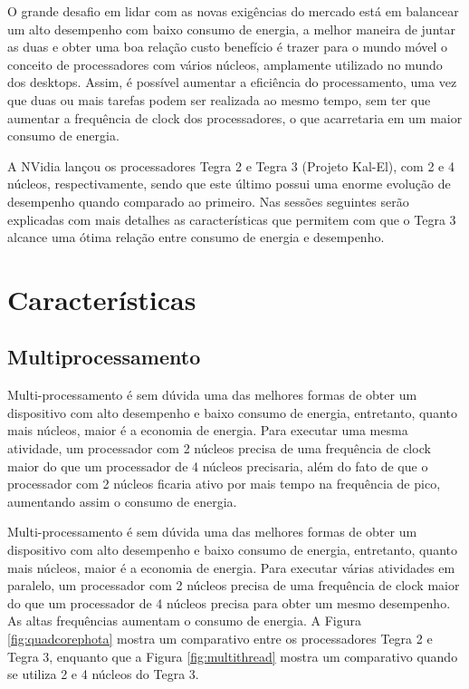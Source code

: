 \documentclass[article]{IEEEtran}
\begin{document}
O grande desafio em lidar com as novas exig\^encias do mercado est\'a em balancear um alto desempenho com baixo consumo de energia, a melhor maneira de juntar as duas e obter uma boa rela\c{c}\~ao custo benef\'icio \'e trazer para o mundo m\'ovel o conceito de processadores com v\'arios n\'ucleos, amplamente utilizado no mundo dos desktops. Assim, \'e poss\'ivel aumentar a efici\^encia do processamento, uma vez que duas ou mais tarefas podem ser realizada ao mesmo tempo, sem ter que aumentar a frequ\^encia de clock dos processadores, o que acarretaria em um maior consumo de energia.

A NVidia lan\c{c}ou os processadores Tegra 2 e Tegra 3 (Projeto Kal-El), com 2 e 4 n\'ucleos, respectivamente, sendo que este \'ultimo possui uma enorme evolu\c{c}\~ao de desempenho quando comparado ao primeiro. Nas sess\~oes seguintes ser\~ao explicadas com mais detalhes as caracter\'isticas que permitem com que o Tegra 3 alcance uma \'otima rela\c{c}\~ao entre consumo de energia e desempenho.

\section{Caracter\'isticas}

\subsection{Multiprocessamento}

Multi-processamento \'e sem d\'uvida uma das melhores formas de obter um dispositivo com alto desempenho e baixo consumo de energia, entretanto, quanto mais n\'ucleos, maior \'e a economia de energia. Para executar uma mesma atividade, um processador com 2 n\'ucleos precisa de uma frequ\^encia de clock maior do que um processador de 4 n\'ucleos precisaria, al\'em do fato de que o processador com 2 n\'ucleos ficaria ativo por mais tempo na frequ\^encia de pico, aumentando assim o consumo de energia. 

Multi-processamento \'e sem d\'uvida uma das melhores formas de obter um dispositivo com alto desempenho e baixo consumo de energia, entretanto, quanto mais n\'ucleos, maior \'e a economia de energia. Para executar várias atividades em paralelo, um processador com 2 n\'ucleos precisa de uma frequ\^encia de clock maior do que um processador de 4 n\'ucleos precisa para obter um mesmo desempenho. As altas frequ\^encias aumentam o consumo de energia. A Figura \ref{fig:quadcorephota} mostra um comparativo entre os processadores Tegra 2 e Tegra 3, enquanto que a Figura \ref{fig:multithread} mostra um comparativo quando se utiliza 2 e 4 n\'ucleos do Tegra 3.
\end{document}

